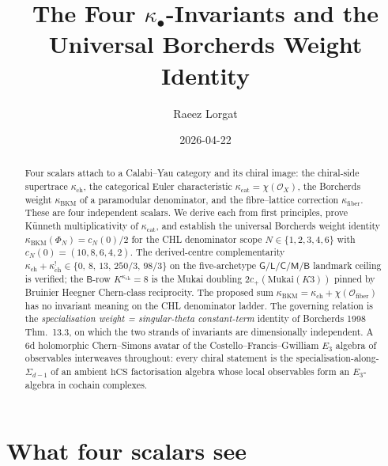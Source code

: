 \documentclass[11pt]{article}
\title{The Four $\kappa_\bullet$-Invariants and the Universal Borcherds Weight Identity}
\author{Raeez Lorgat}
\date{2026-04-22}
\newcommand{\cO}{\mathcal{O}}
\newcommand{\hCS}{\mathrm{hCS}}
\newcommand{\Mukai}{\mathrm{Mukai}}
\begin{document}
\maketitle

\begin{abstract}
Four scalars attach to a Calabi--Yau category and its chiral image: the
chiral-side supertrace $\kappa_{\mathrm{ch}}$, the categorical Euler
characteristic $\kappa_{\mathrm{cat}}=\chi(\cO_X)$, the Borcherds weight
$\kappa_{\mathrm{BKM}}$ of a paramodular denominator, and the
fibre--lattice correction $\kappa_{\mathrm{fiber}}$. These are four
independent scalars. We derive each from first principles, prove
K\"unneth multiplicativity of $\kappa_{\mathrm{cat}}$, and establish the
universal Borcherds weight identity
$\kappa_{\mathrm{BKM}}(\Phi_N)=c_N(0)/2$ for the CHL denominator
scope $N\in\{1,2,3,4,6\}$ with $c_N(0)=(10,8,6,4,2)$. The derived-centre
complementarity $\kappa_{\mathrm{ch}}+\kappa_{\mathrm{ch}}^{!}\in
\{0,\,8,\,13,\,250/3,\,98/3\}$ on the five-archetype
$\mathsf{G}/\mathsf{L}/\mathsf{C}/\mathsf{M}/\mathsf{B}$ landmark
ceiling is verified; the $\mathsf{B}$-row $K^{\kappa_{\mathrm{ch}}}=8$ is the Mukai
doubling $2c_{+}(\Mukai(K3))$ pinned by Bruinier Heegner
Chern-class reciprocity. The proposed sum
$\kappa_{\mathrm{BKM}}=\kappa_{\mathrm{ch}}+\chi(\cO_{\mathrm{fiber}})$
has no invariant meaning on the CHL denominator ladder. The governing relation is the
\emph{specialisation weight = singular-theta constant-term}
identity of Borcherds 1998 Thm.~13.3, on which the two strands of
invariants are dimensionally independent. A 6d holomorphic
Chern--Simons avatar of the Costello--Francis--Gwilliam $E_3$ algebra
of observables interweaves throughout: every chiral statement is the
specialisation-along-$\Sigma_{d-1}$ of an ambient $\hCS$ factorisation
algebra whose local observables form an $E_3$-algebra in cochain
complexes.
\end{abstract}

\tableofcontents

\section{What four scalars see}
\label{sec:what-four-scalars-see}
\end{document}
